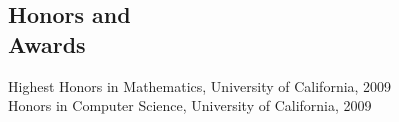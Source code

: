 \documentclass[margin,line]{resume}
\begin{document}
\begin{resume}
    \section{\mysidestyle Honors and\\Awards} 

    Highest Honors in Mathematics, University of California, 2009       \vspace{1mm}\\%
    Honors in Computer Science, University of California, 2009          \vspace{1mm}\\%


\end{resume}
\end{document}
